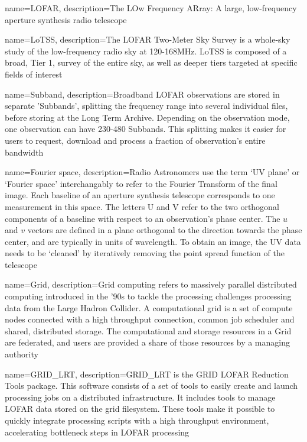 
\makeglossaries

{
    name=LOFAR,
    description={The LOw Frequency ARray: A large, low-frequency aperture synthesis radio telescope} 
}

{
    name=LoTSS,
    description={The LOFAR Two-Meter Sky Survey is a whole-sky study of the low-frequency radio sky at 120-168MHz. LoTSS is composed of a broad, Tier 1, survey of the entire sky, as well as deeper tiers targeted at specific fields of interest }
}


{
    name=Subband,
    description={Broadband LOFAR observations are stored in separate 'Subbands', splitting the frequency range into several individual files, before storing at the Long Term Archive. Depending on the observation mode, one observation can have 230-480 Subbands. This splitting makes it easier for users to request, download and process a fraction of observation's entire bandwidth}
}



{
    name={Fourier space},
    description={Radio Astronomers use the term `UV plane' or `Fourier space' interchangably to refer to the Fourier Transform of the final image. Each baseline of an aperture synthesis telescope corresponds to one measurement in this space. The letters U and V refer to the two  orthogonal components of a baseline with respect to an observation's phase center. The $u$ and $v$ vectors are defined in a plane orthogonal to the direction towards the phase center, and are typically in units of wavelength. To obtain an image, the UV data needs to be `cleaned' by iteratively removing the point spread function of the telescope}
}

{   
    name={Grid},
    description={Grid computing refers to massively parallel distributed computing introduced in the '90s to tackle the processing challenges processing data from the Large Hadron Collider. A computational grid is a set of compute nodes connected with a high throughput connection, common job scheduler and shared, distributed storage. The computational and storage resources in a Grid are federated, and users are provided a share of those resources by a managing authority }
}

{
    name={GRID\_LRT},
    description={GRID\_LRT is the GRID LOFAR Reduction Tools package. This software consists of a set of tools to easily create and launch processing jobs on a distributed infrastructure. It includes tools to manage LOFAR data stored on the grid filesystem. These tools make it possible to quickly integrate processing scripts with a high throughput environment, accelerating bottleneck steps in LOFAR processing }
}


